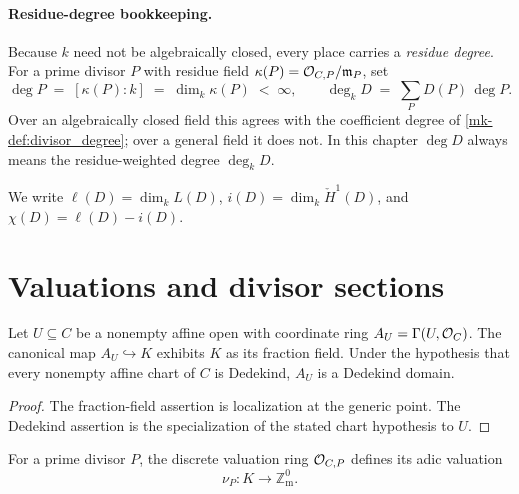 \paragraph{Residue-degree bookkeeping.}
Because \(k\) need not be algebraically closed, every place carries a
\emph{residue degree}. For a prime divisor \(P\) with residue field
\(\kappa(P) = \mathcal{O}_{C, P}/\mathfrak{m}_P\), set
\[
  \deg P \;=\; [\kappa(P) : k] \;=\; \dim_k \kappa(P) \;<\; \infty,
  \qquad
  \deg_k D \;=\; \sum_P D(P)\,\deg P .
\]
Over an algebraically closed field this agrees with the coefficient degree
of \ref{mk-def:divisor_degree}; over a general field it does not.  In this
chapter \(\deg D\) always means the residue-weighted degree \(\deg_kD\).

We write \(\ell(D) = \dim_k L(D)\),
\(i(D) = \dim_k \check{H}^1(D)\), and
\(\chi(D) = \ell(D) - i(D)\).

\section{Valuations and divisor sections}
\label{mk-sec:RiemannRoch_Adelic_substrate}

\begin{proposition}
  \label{mk-thm:adelic_chartRing_isDedekindDomain}
  \leanok

  Let \(U \subseteq C\) be a nonempty affine open with coordinate ring
  \(A_U = \Gamma(U, \mathcal{O}_{C})\).  The canonical map
  \(A_U\hookrightarrow K\) exhibits \(K\) as its fraction field.  Under
  the hypothesis that every nonempty affine chart of \(C\) is Dedekind,
  \(A_U\) is a Dedekind domain.
\end{proposition}
\begin{proof}
  \leanok
  The fraction-field assertion is localization at the generic point.
  The Dedekind assertion is the specialization of the stated chart
  hypothesis to \(U\).
\end{proof}

\begin{definition}
  \label{mk-def:adelic_pointValuation}
  \leanok


  For a prime divisor \(P\), the discrete valuation ring
  \(\mathcal{O}_{C,P}\) defines its adic valuation
  \[
    \nu_P\colon K\longrightarrow\mathbb Z_{\mathrm m}^{0}.
  \]
\end{definition}

